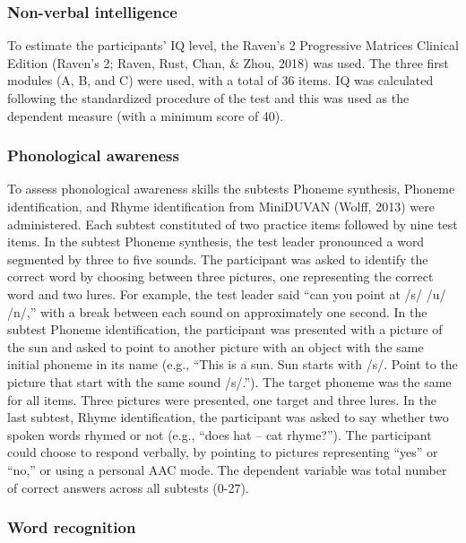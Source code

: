 \documentclass[
  ,
]{article}
\begin{document}
\hypertarget{non-verbal-intelligence}{%
\subsubsection{Non-verbal intelligence}\label{non-verbal-intelligence}}

To estimate the participants' IQ level, the Raven's 2 Progressive
Matrices Clinical Edition (Raven's 2; Raven, Rust, Chan, \& Zhou, 2018)
was used. The three first modules (A, B, and C) were used, with a total
of 36 items. IQ was calculated following the standardized procedure of
the test and this was used as the dependent measure (with a minimum
score of 40).

\hypertarget{phonological-awareness}{%
\subsubsection{Phonological awareness}\label{phonological-awareness}}

To assess phonological awareness skills the subtests Phoneme synthesis,
Phoneme identification, and Rhyme identification from MiniDUVAN (Wolff,
2013) were administered. Each subtest constituted of two practice items
followed by nine test items. In the subtest Phoneme synthesis, the test
leader pronounced a word segmented by three to five sounds. The
participant was asked to identify the correct word by choosing between
three pictures, one representing the correct word and two lures. For
example, the test leader said ``can you point at /s/ /u/ /n/,'' with a
break between each sound on approximately one second. In the subtest
Phoneme identification, the participant was presented with a picture of
the sun and asked to point to another picture with an object with the
same initial phoneme in its name (e.g., ``This is a sun. Sun starts with
/s/. Point to the picture that start with the same sound /s/.''). The
target phoneme was the same for all items. Three pictures were
presented, one target and three lures. In the last subtest, Rhyme
identification, the participant was asked to say whether two spoken
words rhymed or not (e.g., ``does hat -- cat rhyme?''). The participant
could choose to respond verbally, by pointing to pictures representing
``yes'' or ``no,'' or using a personal AAC mode. The dependent variable
was total number of correct answers across all subtests (0-27).

\hypertarget{word-recognition}{%
\subsubsection{Word recognition}\label{word-recognition}}
\end{document}
